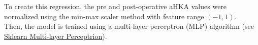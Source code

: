 \documentclass{article}
\begin{document}
To create this regression, the pre and post-operative aHKA values were normalized using the min-max scaler
method with feature range $(-1, 1)$.\\
Then, the model is trained using a multi-layer perceptron (MLP) algorithm 
(see \href{https://scikit-learn.org/stable/modules/generated/sklearn.neural_network.MLPRegressor.html}{\underline{Sklearn Multi-layer Perceptrion}}).
\end{document}
